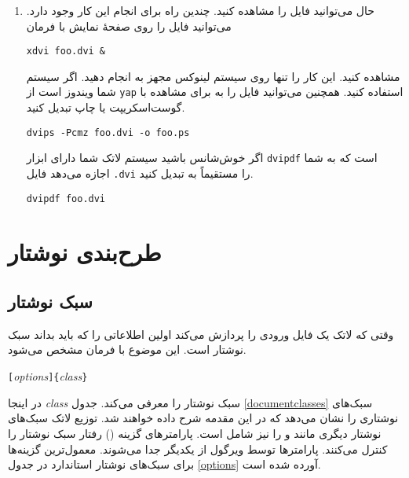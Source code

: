 {\begin{enumerate}
\item 
حال می‌توانید فایل  را مشاهده کنید. چندین راه برای انجام این کار وجود دارد. می‌توانید فایل را روی صفحهٔ نمایش با فرمان
\begin{lscommand}
\verb+xdvi foo.dvi &+
\end{lscommand}
مشاهده کنید. این کار را تنها روی سیستم لینوکس مجهز به  انجام دهید. اگر سیستم شما ویندوز است از \texttt{yap} استفاده کنید. همچنین می‌توانید فایل  را به \PSi{} برای مشاهده با گوست‌اسکریپت یا چاپ تبدیل کنید.
\begin{lscommand}
\verb+dvips -Pcmz foo.dvi -o foo.ps+
\end{lscommand}
اگر خوش‌شانس باشید سیستم لاتک شما دارای ابزار \texttt{dvipdf} است که به شما اجازه می‌دهد فایل \texttt{.dvi} را مستقیماً به  تبدیل کنید.
\begin{lscommand}
\verb+dvipdf foo.dvi+
\end{lscommand}

\end{enumerate}

\section{طرح‌بندی نوشتار}

\subsection{سبک نوشتار}\label{sec:documentclass}

وقتی که لاتک یک فایل ورودی را پردازش می‌کند اولین اطلاعاتی را که باید بداند سبک نوشتار است. این موضوع با فرمان
 مشخص می‌شود.


\begin{lscommand}
\verb|[|\emph{options}\verb|]{|\emph{class}\verb|}|
\end{lscommand}
\noindent 
در اینجا 
\emph{class} 
سبک نوشتار را معرفی می‌کند. جدول
\ref{documentclasses}
سبک‌های نوشتاری را نشان می‌دهد که در این مقدمه شرح داده خواهند شد.
توزیع لاتک سبک‌های نوشتار دیگری مانند 
 و  
را نیز شامل است. پارامترهای گزینه 
(\emph{}) 
رفتار سبک نوشتار را کنترل می‌کنند.
پارامترها توسط ویرگول از یکدیگر جدا می‌شوند. معمول‌ترین گزینه‌ها برای سبک‌های نوشتار استاندارد در جدول  
\ref{options}
 آورده شده است.

}
